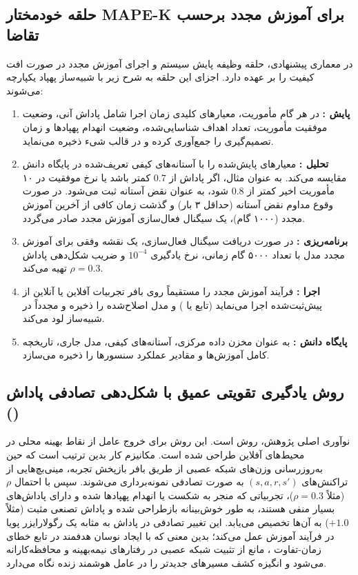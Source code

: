 \documentclass[oneside,openany,a4paper,12pt,draft]{article}
\begin{document}
\subsection{حلقه خودمختار MAPE-K برای آموزش مجدد برحسب تقاضا}
در معماری پیشنهادی، حلقه  وظیفه پایش سیستم و اجرای آموزش مجدد در صورت افت کیفیت را بر عهده دارد. اجزای این حلقه به شرح زیر با شبیه‌ساز پهپاد یکپارچه می‌شوند:
\begin{enumerate}
    \item \textbf{پایش :} در هر گام مأموریت، معیارهای کلیدی زمان اجرا شامل پاداش آنی، وضعیت موفقیت مأموریت، تعداد اهداف شناسایی‌شده، وضعیت انهدام پهپادها و زمان تصمیم‌گیری را جمع‌آوری کرده و در قالب شیء  ذخیره می‌نماید.
    \item \textbf{تحلیل :} معیارهای پایش‌شده را با آستانه‌های کیفی تعریف‌شده در پایگاه دانش مقایسه می‌کند. به عنوان مثال، اگر پاداش از $0.7$ کمتر باشد یا نرخ موفقیت در ۱۰ مأموریت اخیر کمتر از $0.8$ شود، به عنوان نقض آستانه ثبت می‌شود. در صورت وقوع مداوم نقض آستانه (حداقل ۳ بار) و گذشت زمان کافی از آخرین آموزش مجدد (۱۰۰۰ گام)، یک سیگنال فعال‌سازی آموزش مجدد صادر می‌گردد.
    \item \textbf{برنامه‌ریزی :} در صورت دریافت سیگنال فعال‌سازی، یک نقشه وفقی  برای آموزش مجدد مدل با تعداد ۵۰۰۰ گام زمانی، نرخ یادگیری $10^{-4}$ و ضریب شکل‌دهی پاداش $\rho = 0.3$ تهیه می‌کند.
    \item \textbf{اجرا :} فرآیند آموزش مجدد را مستقیماً روی بافر تجربیات آفلاین یا آنلاین از پیش‌ثبت‌شده اجرا می‌نماید (تابع  یا ) و مدل اصلاح‌شده را ذخیره و مجدداً در شبیه‌ساز لود می‌کند.
    \item \textbf{پایگاه دانش :} به عنوان مخزن داده مرکزی، آستانه‌های کیفی، مدل جاری، تاریخچه کامل آموزش‌ها و مقادیر عملکرد سنسورها را ذخیره می‌سازد.
\end{enumerate}

\subsection{روش یادگیری تقویتی عمیق با شکل‌دهی تصادفی پاداش ()}
نوآوری اصلی پژوهش، روش  است. این روش برای خروج عامل از نقاط بهینه محلی در محیط‌های آفلاین طراحی شده است. مکانیزم کار بدین ترتیب است که حین به‌روزرسانی وزن‌های شبکه عصبی  از طریق بافر بازپخش تجربه، مینی‌بچ‌هایی از تراکنش‌های $(s, a, r, s')$ به صورت تصادفی نمونه‌برداری می‌شوند. سپس با احتمال $\rho$ (مثلاً $\rho=0.3$)، تجربیاتی که منجر به شکست یا انهدام پهپادها شده و دارای پاداش‌های بسیار منفی هستند، به طور خوش‌بینانه بازطراحی شده و پاداش تصنعی مثبت (مثلاً $+1.0$) به آن‌ها تخصیص می‌یابد. این تغییر تصادفی در پاداش به مثابه یک رگولارایزر پویا در فرآیند آموزش عمل می‌کند؛ بدین معنی که با ایجاد نوسان هدفمند در تابع خطای زمان-تفاوت ، مانع از تثبیت شبکه عصبی در رفتارهای نیمه‌بهینه و محافظه‌کارانه می‌شود و انگیزه کشف مسیرهای جدیدتر را در عامل هوشمند زنده نگاه می‌دارد.
\end{document}
